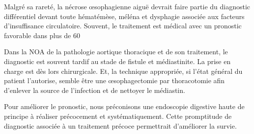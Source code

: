 \documentclass[./discussion.tex]{subfiles}
\begin{document}
Malgré sa rareté, la nécrose œsophagienne aiguë devrait faire partie du diagnostic différentiel devant toute hématémèse, méléna et dysphagie associée aux facteurs d’insuffisance circulatoire. Souvent, le traitement est médical avec un pronostic favorable dans plus de 60%

Dans la NOA de la pathologie aortique thoracique et de son traitement, le diagnostic est souvent tardif au stade de fistule et médiastinite. La prise en charge est dès lors chirurgicale. Et, la technique appropriée, si l’état général du patient l’autorise, semble être une œsophagectomie par thoracotomie afin d’enlever la source de l’infection et de nettoyer le médiastin.

Pour améliorer le pronostic, nous préconisons une endoscopie digestive haute de principe à réaliser précocement et systématiquement. Cette promptitude de diagnostic associée à un traitement précoce permettrait d’améliorer la survie. 
\end{document}
